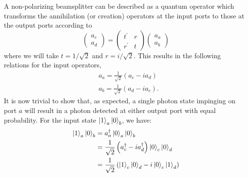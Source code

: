 A non-polarizing beamsplitter can be described as a quantum operator which transforms the annihilation (or creation) operators at the input ports to those at the output ports according to
\begin{equation}
\left(\begin{array}{l}
    a_{c} \\
    a_{d}
    \end{array}\right)=\left(\begin{array}{ll}
    t^{\prime} & r \\
    r^{\prime} & t
    \end{array}\right)\left(\begin{array}{l}
    a_{a} \\
    a_{b}
\end{array}\right)
\end{equation}
where we will take $t=1/\sqrt{2}$ and $r=i/\sqrt{2}$. This results in the following relations for the input operators,
\begin{equation}
\begin{aligned}
&a_{a}=\frac{1}{\sqrt{2}}\left(a_{c} - i a_{d}\right) \\
&a_{b}=\frac{1}{\sqrt{2}}\left(a_{d} - i a_{c}\right).
\end{aligned}
\end{equation}
It is now trivial to show that, as expected, a single photon state impinging on port $a$ will result in a photon detected at either output port with equal probability. For the input state $\ket{1}_a\ket{0}_b$, we have:
\begin{equation}
    \begin{aligned}
        \ket{1}_a\ket{0}_b &= a_a^{\dagger}\ket{0}_a\ket{0}_b \\
                           &= \frac{1}{\sqrt{2}}\left(a_{c}^{\dagger} - i a_{d}^{\dagger}\right)\ket{0}_c\ket{0}_d \\
                           &= \frac{1}{\sqrt{2}}\left(\ket{1}_c\ket{0}_d - i \ket{0}_c\ket{1}_d\right)
    \end{aligned}
\end{equation}

